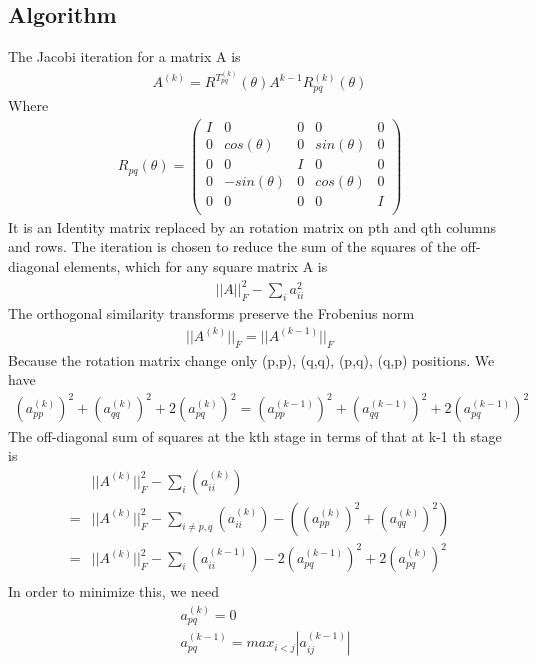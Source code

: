 \documentclass[a4paper]{article}
\begin{document}
\subsection{Algorithm}
The Jacobi iteration for a matrix A is
\begin{align*}
	A^{(k)} = R^T^{(k)}_{pq}(\theta) A^{k-1} R_{pq}^{(k)} (\theta)
\end{align*}
Where
\begin{align*}
	R_{pq}(\theta)
	= 
	\left( \begin{array}{ccccc}
I      & 	0 	& 	0 	 & 	 0 		& 	0 	\\
0	   & 	cos(\theta) 	& 	0 	 &	 sin(\theta) 		& 	0	\\
0 	   &    0   &   I  	 &   0		&	0	\\
0 	   &    -sin(\theta)   &   0    &   cos(\theta)		& 	0	\\
0      &    0   &   0    & 	 0   	& 	I	\\\end{array} \right)
\end{align*}
It is an Identity matrix replaced by an rotation matrix on pth and qth columns and rows. The iteration is chosen to reduce the sum of the squares of the off-diagonal elements, which for any square matrix A is
\begin{align*}
	||A||_F^2 - \sum_i a_{ii}^2
\end{align*}
The orthogonal similarity transforms preserve the Frobenius norm
\begin{align*}
	|| A^{(k)}||_F = ||A^{(k-1)}||_F
\end{align*}
Because the rotation matrix change only (p,p), (q,q), (p,q), (q,p) positions. We have
\begin{align*}
	(a_{pp}^{(k)})^2 + (a_{qq}^{(k)})^2+ 2 (a_{pq}^{(k)})^2 = (a_{pp}^{(k-1)})^2 + (a_{qq}^{(k-1)})^2 + 2 (a_{pq}^{(k-1)})^2   
\end{align*}
The off-diagonal sum of squares at the kth stage in terms of that at k-1 th stage is
\begin{align*}
	& || A^{(k)}||^2_F - \sum_i (a_{ii}^{(k)}) \\
	= & || A^{(k)}||^2_F - \sum_{i \neq p,q} (a_{ii}^{(k)}) -( (a_{pp}^{(k)})^2 + (a_{qq}^{(k)})^2 ) \\
	= & || A^{(k)}||^2_F - \sum_i (a_{ii}^{(k-1)}) - 2 (a_{pq}^{(k-1)})^2  + 2 (a_{pq}^{(k)})^2  \\
\end{align*}
In order to minimize this, we need
\begin{align*}
	& a_{pq}^{(k)} = 0\\
	& a_{pq}^{(k-1)} = max _{i<j} |a_{ij} ^ {(k-1)}|\\
\end{align*}
\end{document}
